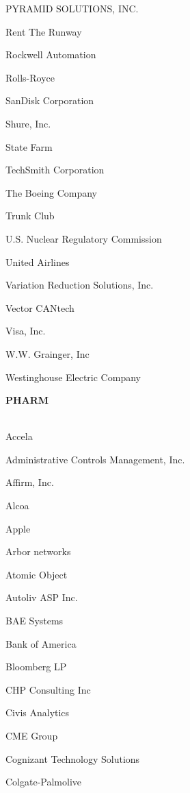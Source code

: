 \documentclass[twoside]{article}
\begin{document}
\begin{center}
\begin{multicols}{5}
\begin{FlushLeft}
\begin{compactitem}
\item PYRAMID SOLUTIONS, INC.
\item Rent The Runway
\item Rockwell Automation
\item Rolls-Royce
\item SanDisk Corporation
\item Shure, Inc.
\item State Farm
\item TechSmith Corporation
\item The Boeing Company
\item Trunk Club
\item U.S. Nuclear Regulatory Commission
\item United Airlines
\item Variation Reduction Solutions, Inc.
\item Vector CANtech
\item Visa, Inc.
\item W.W. Grainger, Inc
\item Westinghouse Electric Company
\end{compactitem}
        \end{FlushLeft}
        \vspace{1em}
        {\fontsize{14}{16}\selectfont \bf PHARM}\\
        \vspace{-1em}
        ~\hrulefill~
        \vspace{-.9em}
        \begin{FlushLeft}
        \begin{compactitem}
        \item Accela
\item Administrative Controls Management, Inc.
\item Affirm, Inc.
\item Alcoa
\item Apple
\item Arbor networks
\item Atomic Object
\item Autoliv ASP Inc.
\item BAE Systems
\item Bank of America
\item Bloomberg LP
\item CHP Consulting Inc
\item Civis Analytics
\item CME Group
\item Cognizant Technology Solutions
\item Colgate-Palmolive

\end{compactitem}
\end{FlushLeft}
\end{multicols}
\end{center}
\end{document}
